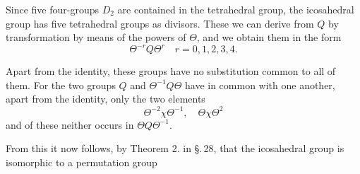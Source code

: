 Since five four-groups $D_2$ are contained in the tetrahedral group, the icosahedral group has five tetrahedral groups as divisors. %
These we can derive from $Q$ by transformation by means of the powers of $\Theta$, and we obtain them in the form
\[
\Theta^{-r}Q\Theta^r \quad r=0,1,2,3,4.
\]

Apart from the identity, these groups have no substitution common to all of them. For the two groups $Q$ and $\Theta^{-1}Q\Theta$ have in common with one another, apart from the identity, only the two elements
\[
\Theta^{-2}\chi\Theta^{-1}, \quad \Theta\chi\Theta^2
\]
and of these neither occurs in $\Theta Q\Theta^{-1}$.

From this it now follows, by Theorem 2. in \S.\,28, that the icosahedral group is isomorphic to a permutation group
